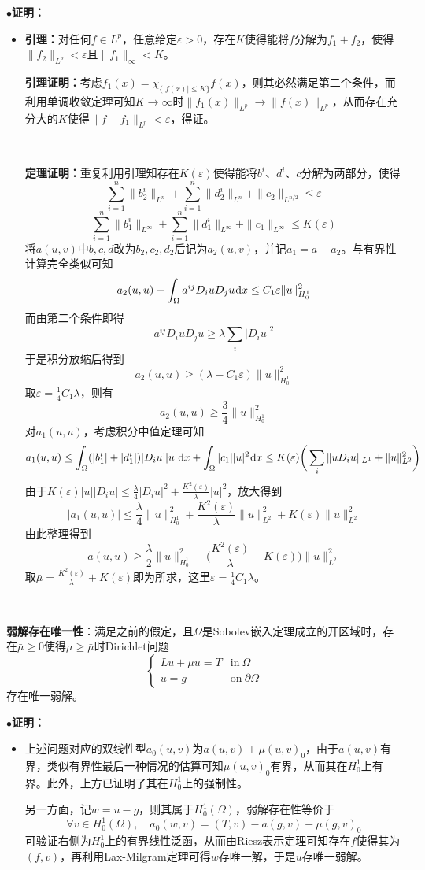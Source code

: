 \documentclass[a4paper,UTF8,fontset=windows,AutoFakeBold]{ctexart}
\newcommand*{\dr}{\hspace{0.07em}\mathrm{d}}
\newcommand{\proo}[1]{{\kaishu $\bullet$\textbf{证明：}
\begin{itemize}
    \item[] #1
\end{itemize}
}}
\begin{document}
\proo{
    \textbf{引理：}对任何$f\in L^p$，任意给定$\varepsilon>0$，存在$K$使得能将$f$分解为$f_1+f_2$，使得$\|f_2\|_{L^p}<\varepsilon$且$\|f_1\|_\infty <K$。

    \textbf{引理证明：}考虑$f_1(x)=\chi_{\{|f(x)|\le K\}}f(x)$，则其必然满足第二个条件，而利用单调收敛定理可知$K\to\infty$时$\|f_1(x)\|_{L^p}\to\|f(x)\|_{L^p}$，从而存在充分大的$K$使得$\|f-f_1\|_{L^p}<\varepsilon$，得证。

    \

    \textbf{定理证明：}重复利用引理知存在$K(\varepsilon)$使得能将$b^i$、$d^i$、$c$分解为两部分，使得
    $$\sum_{i=1}^n\|b^i_2\|_{L^n}+\sum_{i=1}^n\|d^i_2\|_{L^n}+\|c_2\|_{L^{n/2}}\le\varepsilon$$
    $$\sum_{i=1}^n\|b^i_1\|_{L^\infty}+\sum_{i=1}^n\|d^i_1\|_{L^\infty}+\|c_1\|_{L^\infty}\le K(\varepsilon)$$
    将$a(u,v)$中$b,c,d$改为$b_2,c_2,d_2$后记为$a_2(u,v)$，并记$a_1=a-a_2$。与有界性计算完全类似可知
    $$a_2(u,u)-\int_\Omega a^{ij}D_iuD_ju\dr x\le C_1\varepsilon\|u\|_{H_0^1}^2$$
    而由第二个条件即得
    $$a^{ij}D_iuD_ju\ge\lambda\sum_i|D_iu|^2$$
    于是积分放缩后得到
    $$a_2(u,u)\ge(\lambda-C_1\varepsilon)\|u\|_{H_0^1}^2$$
    取$\varepsilon=\frac{1}{4}C_1\lambda$，则有
    $$a_2(u,u)\ge\frac{3}{4}\|u\|_{H_0^1}^2$$
    对$a_1(u,u)$，考虑积分中值定理可知
    $$a_1(u,u)\le\int_\Omega(|b_1^i|+|d_1^i|)|D_iu||u|\dr x+\int_\Omega|c_1||u|^2\dr x\le K(\varepsilon)\bigg(\sum_i\|uD_iu\|_{L^1}+\|u\|_{L^2}^2\bigg)$$
    由于$K(\varepsilon)|u||D_iu|\le\frac{\lambda}{4}|D_iu|^2+\frac{K^2(\varepsilon)}{\lambda}|u|^2$，放大得到
    $$|a_1(u,u)|\le\frac{\lambda}{4}\|u\|_{H_0^1}^2+\frac{K^2(\varepsilon)}{\lambda}\|u\|_{L^2}^2+K(\varepsilon)\|u\|_{L^2}^2$$
    由此整理得到
    $$a(u,u)\ge\frac{\lambda}{2}\|u\|_{H_0^1}^2-\bigg(\frac{K^2(\varepsilon)}{\lambda}+K(\varepsilon)\bigg)\|u\|_{L^2}^2$$
    取$\bar\mu=\frac{K^2(\varepsilon)}{\lambda}+K(\varepsilon)$即为所求，这里$\varepsilon=\frac{1}{4}C_1\lambda$。
}

\

\textbf{弱解存在唯一性}：满足之前的假定，且$\Omega$是Sobolev嵌入定理成立的开区域时，存在$\bar\mu\ge0$使得$\mu\ge\bar\mu$时Dirichlet问题
$$\begin{cases}Lu+\mu u=T&\text{in}\ \Omega\\u=g&\text{on}\ \partial\Omega\end{cases}$$
存在唯一弱解。

\proo{
    上述问题对应的双线性型$a_0(u,v)$为$a(u,v)+\mu(u,v)_0$，由于$a(u,v)$有界，类似有界性最后一种情况的估算可知$\mu(u,v)_0$有界，从而其在$H_0^1$上有界。此外，上方已证明了其在$H_0^1$上的强制性。

    另一方面，记$w=u-g$，则其属于$H_0^1(\Omega)$，弱解存在性等价于
    $$\forall v\in H_0^1(\Omega),\quad a_0(w,v)=(T,v)-a(g,v)-\mu(g,v)_0$$
    可验证右侧为$H_0^1$上的有界线性泛函，从而由Riesz表示定理可知存在$f$使得其为$(f,v)$，再利用Lax-Milgram定理可得$w$存唯一解，于是$u$存唯一弱解。
}
\end{document}
